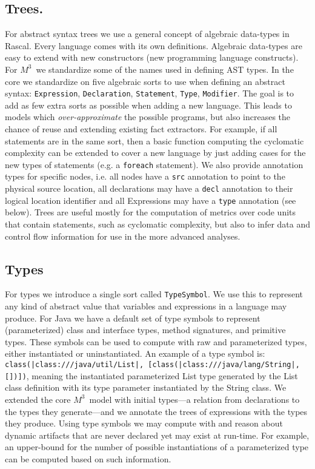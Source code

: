 \documentclass[conference]{IEEEtran}
\newcommand{\loc}[1]{\small{\texttt{#1}}\xspace}
\newcommand{\mthree}{\ensuremath{M^3}\xspace}
\begin{document}
\subsection{Trees.} For abstract syntax trees we use a general concept of
algebraic data-types in Rascal. Every language comes with its own definitions.
Algebraic data-types are easy to extend with new constructors (new programming
language constructs). For \mthree\ we standardize some of the names used in
defining AST types. In the core we standardize on five algebraic sorts to use
when defining an abstract syntax: \texttt{Expression}, \texttt{Declaration},
\texttt{Statement}, \texttt{Type}, \texttt{Modifier}. The goal is to add as
few extra sorts as possible when adding a new language. This leads to models
which \emph{over-approximate} the possible programs, but also increases the
chance of reuse and extending existing fact extractors. For example, if all
statements are in the same sort, then a basic function computing the
cyclomatic complexity can be extended to cover a new language by just adding
cases for the new types of statements (e.g. a \texttt{foreach} statement). We
also provide annotation types for specific nodes, i.e. all nodes have a
\texttt{src} annotation to point to the physical source location, all
declarations may have a \texttt{decl} annotation to their logical location
identifier and all Expressions may have a \texttt{type} annotation (see
below).
%
Trees are useful mostly for the computation of metrics over code units that
contain statements, such as cyclomatic complexity, but also to infer data and
control flow information for use in the more advanced analyses. 


\subsection{Types} For types we introduce a single sort called
\texttt{TypeSymbol}. We use this to represent any kind of abstract value that
variables and expressions in a language may produce. For Java we have a
default set of type symbols to represent (parameterized) class and interface
types, method signatures, and primitive types. These symbols can be used to
compute with raw and parameterized types, either instantiated or
uninstantiated. An example of a type symbol is:
\loc{class(|class:///java/util/List|, [class(|class:///java/lang/String|,[])])}, 
meaning the instantiated
parameterized List type generated by the List class definition with its type
parameter instantiated by the String class. We extended the core \mthree\
model with initial types---a relation from declarations to the types they
generate---and we annotate the trees of expressions with the types they produce.
Using type symbols we may compute with and reason about dynamic artifacts that
are never declared yet may exist at run-time. For example, an upper-bound for
the number of possible instantiations of a parameterized type can be computed
based on such information.
\end{document}
